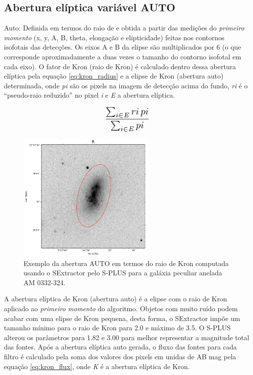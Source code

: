 \subsection{Abertura elíptica variável AUTO}
Auto: Definida em termos do raio de  e obtida a partir das medições do \emph{primeiro momento} (x, y, A, B, theta, elongação e elipticidade) feitas nos contornos isofotais das detecções. Os eixos A e B da elipse são multiplicados por 6 (o que corresponde aproximadamente a duas vezes o tamanho do contorno isofotal em cada eixo). O fator de Kron (raio de Kron) é calculado dentro dessa abertura elíptica pela equação \ref{eq:kron_radius} e a elipse de Kron (abertura auto) determinada, onde \emph{pi} são os pixels na imagem de detecção acima do fundo, \emph{ri} é o ``pseudo-raio reduzido'' no pixel \emph{i} e \emph{E} a abertura elíptica.

\begin{equation} \label{eq:kron_radius}
\scalebox{1.4}{$\displaystyle \frac{\sum_{i \in \mathit{E}} ri \, pi}{\sum_{i \in \mathit{E}} pi}$}
\end{equation}

\begin{figure}[h]
  \centering 
  \includegraphics[width=0.6\textwidth]{Imagens/auto_exemplo.png} 
  \caption[Exemplo da abertura AUTO para a galáxia AM 0332-324.]{Exemplo da abertura AUTO em termos do raio de Kron computada usando o SExtractor pelo S-PLUS para a galáxia peculiar anelada AM 0332-324.}
  \label{fig:auto_exemplo} 
\end{figure}

A abertura elíptica de Kron (abertura auto) é a elipse com o raio de Kron aplicado ao \emph{primeiro momento} do algoritmo. Objetos com muito ruído podem acabar com uma elipse de Kron pequena, desta forma, o SExtractor impõe um tamanho mínimo para o raio de Kron para 2.0 e máximo de 3.5. O S-PLUS alterou os parâmetros para 1.82 e 3.00 para melhor representar a magnitude total das fontes. Após a abertura elíptica auto gerada, o fluxo das fontes para cada filtro é calculado pela soma dos valores dos pixels em unidas de AB mag pela equação \ref{eq:kron_flux}, onde \emph{K} é a abertura elíptica de Kron.

